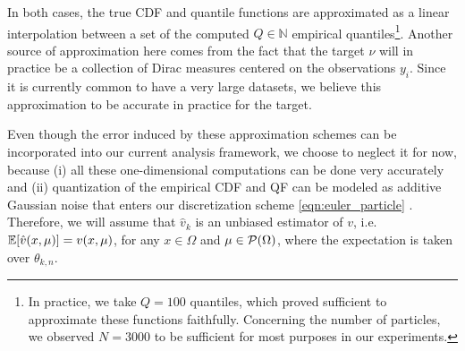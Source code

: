 In both cases, the true CDF and quantile functions are approximated as a linear interpolation between a set of the computed $Q\in\mathbb{N}$ empirical quantiles\footnote{In practice, we take $Q=100$ quantiles, which proved sufficient to approximate these functions faithfully. Concerning the number of particles, we observed $N=3000$ to be sufficient for most purposes in our experiments.}. 
Another source of approximation here comes from the fact that the target $\nu$ will in practice be a collection of Dirac measures centered on the observations $y_i$. Since it is currently common to have a very large datasets, we believe this approximation to be accurate in practice for the target. 

Even though the error induced by these approximation schemes can be incorporated into our current analysis framework, we choose to neglect it for now, because (i) all these one-dimensional computations can be done very accurately and (ii) quantization of the empirical CDF and QF can be modeled as additive Gaussian noise that enters our discretization scheme \eqref{eqn:euler_particle} . Therefore, we will assume that $\hat{v}_k$ is an unbiased estimator of $v$, i.e.\ $\mathbb{E}[\hat{v}(x,\mu)] = v(x,\mu)$, for any $x\in \Omega$ and $\mu \in {\cal P}(\Omega)$, where the expectation is taken over $\theta_{k,n}$.



